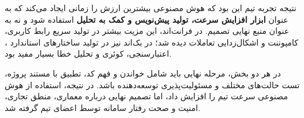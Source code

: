 \documentclass[12pt,a4paper]{article}
\newcommand{\eng}[1]{\lr{#1}}
\begin{document}
نتیجه تجربه تیم این بود که هوش مصنوعی بیشترین ارزش را زمانی ایجاد می‌کند که به عنوان
\textbf{ابزار افزایش سرعت، تولید پیش‌نویس و کمک به تحلیل} استفاده شود و نه به عنوان منبع نهایی تصمیم.
در فرانت‌اند، این مزیت بیشتر در تولید سریع رابط کاربری، کامپوننت و اشکال‌زدایی تعاملات دیده شد؛
در بک‌اند نیز در تولید ساختارهای استاندارد \eng{DRF}، اعتبارسنجی، کوئری و تحلیل خطا بسیار مفید بود.

در هر دو بخش، مرحله نهایی باید شامل خواندن و فهم کد، تطبیق با مستند پروژه، تست حالت‌های مختلف
و مسئولیت‌پذیری توسعه‌دهنده باشد. در نتیجه، استفاده از هوش مصنوعی سرعت تیم را افزایش داد،
اما تصمیم نهایی درباره معماری، منطق تجاری، امنیت و صحت رفتار سامانه توسط اعضای تیم گرفته شد.
\end{document}
